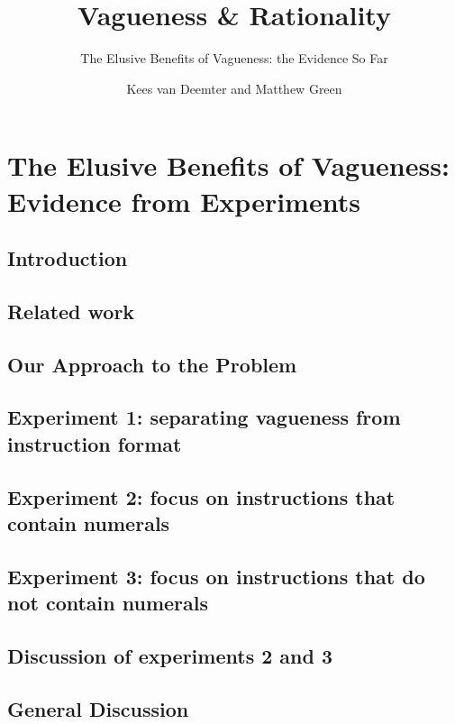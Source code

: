 \documentclass[ %
  graybox       %
 ,envcountchap  %
 ,sectrefs      %
 ,footinfo      %
 ,graphics      %
]{svmono}
\begin{document}
\author{Kees van Deemter and Matthew Green}
\title{Vagueness \& Rationality}
\subtitle{The Elusive Benefits of Vagueness: the Evidence So Far}
\maketitle
\frontmatter
\tableofcontents
\mainmatter
\chapter{The Elusive Benefits of Vagueness: Evidence from Experiments}\label{chapterlabel}

\section{Introduction}\label{introduction}
\section{Related work}\label{related-work}
\section{Our Approach to the Problem}\label{our-approach-to-the-problem}
\section{Experiment 1: separating vagueness from instruction format}\label{e1}
\section{Experiment 2: focus on instructions that contain numerals}\label{e2}
\section{Experiment 3: focus on instructions that do not contain numerals}\label{e3}
\section{Discussion of experiments 2 and 3}\label{discussion-of-e2-and-e3}
\section{General Discussion}\label{general-discussion}
\backmatter


\backmatter
\end{document}
